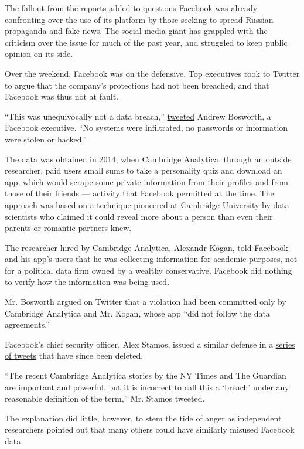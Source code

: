 The fallout from the reports added to questions Facebook was already
confronting over the use of its platform by those seeking to spread
Russian propaganda and fake news. The social media giant has grappled
with the criticism over the issue for much of the past year, and
struggled to keep public opinion on its side.

Over the weekend, Facebook was on the defensive. Top executives took to
Twitter to argue that the company's protections had not been breached,
and that Facebook was thus not at fault.

``This was unequivocally not a data breach,''
\href{https://twitter.com/boztank/status/975018461997887494}{tweeted}
Andrew Bosworth, a Facebook executive. ``No systems were infiltrated, no
passwords or information were stolen or hacked.''

The data was obtained in 2014, when Cambridge Analytica, through an
outside researcher, paid users small sums to take a personality quiz and
download an app, which would scrape some private information from their
profiles and from those of their friends --- activity that Facebook
permitted at the time. The approach was based on a technique pioneered
at Cambridge University by data scientists who claimed it could reveal
more about a person than even their parents or romantic partners knew.

The researcher hired by Cambridge Analytica, Alexandr Kogan, told
Facebook and his app's users that he was collecting information for
academic purposes, not for a political data firm owned by a wealthy
conservative. Facebook did nothing to verify how the information was
being used.

Mr. Bosworth argued on Twitter that a violation had been committed only
by Cambridge Analytica and Mr. Kogan, whose app ``did not follow the
data agreements.''

Facebook's chief security officer, Alex Stamos, issued a similar defense
in a
\href{https://twitter.com/aprilaser/status/975078309930311680}{series of
tweets} that have since been deleted.

``The recent Cambridge Analytica stories by the NY Times and The
Guardian are important and powerful, but it is incorrect to call this a
`breach' under any reasonable definition of the term,'' Mr. Stamos
tweeted.

The explanation did little, however, to stem the tide of anger as
independent researchers pointed out that many others could have
similarly misused Facebook data.

